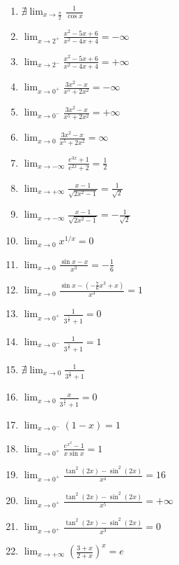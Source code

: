 \documentclass[11pt,a4paper]{article}
\begin{document}
\begin{enumerate}
\item $\displaystyle \nexists \lim_{x \to \frac{\pi}{2}} \frac{1}{\cos x}$
\item $\displaystyle \lim_{x \to 2^{+}} \frac{x^{2} - 5x + 6}{x^{2} - 4x + 4} = -\infty$
\item $\displaystyle \lim_{x \to 2^{-}} \frac{x^{2} - 5x + 6}{x^{2} - 4x + 4} = +\infty$
\item $\displaystyle \lim_{x \to 0^{+}} \frac{3x^{2} - x}{x^{5} + 2x^{2}} = -\infty$
\item $\displaystyle \lim_{x \to 0^{-}} \frac{3x^{2} - x}{x^{5} + 2x^{2}} = +\infty$
\item $\displaystyle \lim_{x \to 0} \frac{3x^{2} - x}{x^{5} + 2x^{2}} = \infty$
\item $\displaystyle \lim_{x \to -\infty} \frac{e^{3x} + 1}{e^{2x} + 2} = \frac{1}{2}$
\item $\displaystyle \lim_{x \to +\infty} \frac{x - 1}{\sqrt{2x^{2} - 1}} = \frac{1}{\sqrt{2}}$
\item $\displaystyle \lim_{x \to -\infty} \frac{x - 1}{\sqrt{2x^{2} - 1}} = -\frac{1}{\sqrt{2}}$
\item $\displaystyle \lim_{x \to 0} x^{1/x} = 0$
\item $\displaystyle \lim_{x \to 0} \frac{\sin x - x}{x^{3}} = -\frac{1}{6}$
\item $\displaystyle \lim_{x \to 0} \frac{\sin x - \left(-\frac{7}{6}x^{3} + x\right)}{x^{3}} = 1$
\item $\displaystyle \lim_{x \to 0^{+}} \frac{1}{3^{\frac{1}{x}} + 1} = 0$
\item $\displaystyle \lim_{x \to 0^{-}} \frac{1}{3^{\frac{1}{x}} + 1} = 1$
\item $\displaystyle \nexists \lim_{x \to 0} \frac{1}{3^{\frac{1}{x}} + 1}$
\item $\displaystyle \lim_{x \to 0} \frac{x}{3^{\frac{1}{x}} + 1} = 0$
\item $\displaystyle \lim_{x \to 0^{-}} \left(1 - x\right) = 1$
\item $\displaystyle \lim_{x \to 0^{+}} \frac{e^{x^{2}} - 1}{x\sin x} = 1$
\item $\displaystyle \lim_{x \to 0^{+}} \frac{\tan^{2}(2x) - \sin^{2}(2x)}{x^{4}} = 16$
\item $\displaystyle \lim_{x \to 0^{+}} \frac{\tan^{2}(2x) - \sin^{2}(2x)}{x^{5}} = +\infty$
\item $\displaystyle \lim_{x \to 0^{+}} \frac{\tan^{2}(2x) - \sin^{2}(2x)}{x^{3}} = 0$
\item $\displaystyle \lim_{x \to +\infty} \left(\frac{3 + x}{2 + x}\right)^{x} = e$

\end{enumerate}
\end{document}
